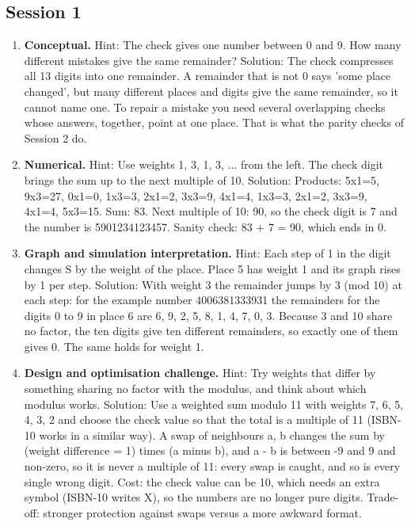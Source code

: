 \documentclass[11pt,a4paper]{article}
\begin{document}
\subsection*{Session 1}
\begin{enumerate}[nosep]
\item \textbf{Conceptual.} Hint: The check gives one number between 0 and 9. How many different mistakes give the same remainder? Solution: The check compresses all 13 digits into one remainder. A remainder that is not 0 says 'some place changed', but many different places and digits give the same remainder, so it cannot name one. To repair a mistake you need several overlapping checks whose answers, together, point at one place. That is what the parity checks of Session 2 do.
\item \textbf{Numerical.} Hint: Use weights 1, 3, 1, 3, ... from the left. The check digit brings the sum up to the next multiple of 10. Solution: Products: 5x1=5, 9x3=27, 0x1=0, 1x3=3, 2x1=2, 3x3=9, 4x1=4, 1x3=3, 2x1=2, 3x3=9, 4x1=4, 5x3=15. Sum: 83. Next multiple of 10: 90, so the check digit is 7 and the number is 5901234123457. Sanity check: 83 + 7 = 90, which ends in 0.
\item \textbf{Graph and simulation interpretation.} Hint: Each step of 1 in the digit changes S by the weight of the place. Place 5 has weight 1 and its graph rises by 1 per step. Solution: With weight 3 the remainder jumps by 3 (mod 10) at each step: for the example number 4006381333931 the remainders for the digits 0 to 9 in place 6 are 6, 9, 2, 5, 8, 1, 4, 7, 0, 3. Because 3 and 10 share no factor, the ten digits give ten different remainders, so exactly one of them gives 0. The same holds for weight 1.
\item \textbf{Design and optimisation challenge.} Hint: Try weights that differ by something sharing no factor with the modulus, and think about which modulus works. Solution: Use a weighted sum modulo 11 with weights 7, 6, 5, 4, 3, 2 and choose the check value so that the total is a multiple of 11 (ISBN-10 works in a similar way). A swap of neighbours a, b changes the sum by (weight difference = 1) times (a minus b), and a - b is between -9 and 9 and non-zero, so it is never a multiple of 11: every swap is caught, and so is every single wrong digit. Cost: the check value can be 10, which needs an extra symbol (ISBN-10 writes X), so the numbers are no longer pure digits. Trade-off: stronger protection against swaps versus a more awkward format.
\end{enumerate}
\end{document}
